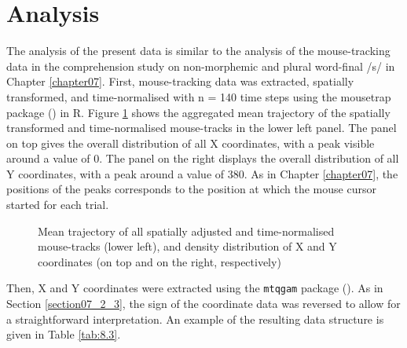 \section{Analysis}\label{section08_2}

The analysis of the present data is similar to the analysis of the mouse-tracking data in the comprehension study on non-morphemic and plural word-final /s/ in Chapter \ref{chapter07}. First, mouse-tracking data was extracted, spatially transformed, and time-normalised with n = 140 time steps using the mousetrap package (\cite{Kieslich2019}) in R. Figure \ref{fig:8_2} shows the aggregated mean trajectory of the spatially transformed and time-normalised mouse-tracks in the lower left panel. The panel on top gives the overall distribution of all X coordinates, with a peak visible around a value of $0$. The panel on the right displays the overall distribution of all Y coordinates, with a peak around a value of $380$. As in Chapter \ref{chapter07}, the positions of the peaks corresponds to the position at which the mouse cursor started for each trial.

\begin{figure}
    \centering
    
    \caption{Mean trajectory of all spatially adjusted and time-normalised mouse-tracks (lower left), and density distribution of X and Y coordinates (on top and on the right, respectively)}
    \label{fig:8_2}
\end{figure}

Then, X and Y coordinates were extracted using the \texttt{mtqgam} package (\cite{Schmitz2021mtqgam}). As in Section \ref{section07_2_3}, the sign of the coordinate data was reversed to allow for a straightforward interpretation. An example of the resulting data structure is given in Table \ref{tab:8.3}.

